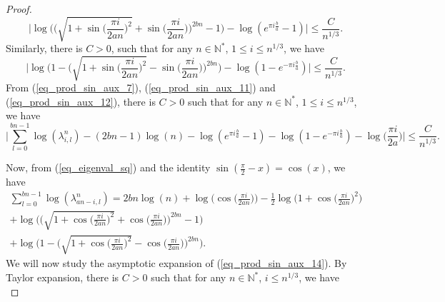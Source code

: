 \documentclass[10pt,a4paper]{amsart}
\newcommand{\nat}{\mathbb{N}}
\begin{document}
\begin{proof}
\begin{equation}
				\bigg|
				\log 
				\Big(
					\Big( \sqrt{ 1 + \sin  \big( \frac{\pi i}{2 a n} \big)^2} + \sin  \big( \frac{\pi i}{2 a n} \big) \Big)^{2bn} - 1
				\Big)
				-
				\log(e^{\pi i \frac{b}{a}} - 1)
				\bigg|
				\leq
				\frac{C}{n^{1/3}}.
			\end{equation}
			Similarly, there is $C > 0$, such that for any $n \in \nat^*$, $1 \leq i \leq  n^{1/3}$, we have
			\begin{equation}\label{eq_prod_sin_aux_12}
				\bigg|
				\log 
				\Big(
					1 - \Big(  \sqrt{ 1 + \sin  \big( \frac{\pi i}{2 a n} \big)^2} - \sin  \big( \frac{\pi i}{2 a n} \big) \Big)^{2bn}
				\Big)
				-
				\log(1 - e^{- \pi i \frac{b}{a}})
				\bigg|
				\leq
				\frac{C}{n^{1/3}}.
			\end{equation}
			From (\ref{eq_prod_sin_aux_7}), (\ref{eq_prod_sin_aux_11}) and (\ref{eq_prod_sin_aux_12}), there is $C > 0$ such that for any $n \in \nat^*$, $1 \leq i \leq  n^{1/3}$, we have
			\begin{equation}\label{eq_prod_sin_aux_13}
				\bigg|
				\sum_{l = 0}^{bn - 1} 
				\log(\lambda_{i, l}^{n})
				-
				(2bn - 1) \log(n) 
				-
				\log(e^{\pi i \frac{b}{a}} - 1)
				-
				\log(1 - e^{- \pi i \frac{b}{a}})
				-
				\log 
				\Big(
					\frac{\pi i}{2 a}
				\Big)
				\bigg|
				\leq
				\frac{C}{n^{1/3}}.
			\end{equation}
			\par Now, from (\ref{eq_eigenval_sq}) and the identity $\sin(\frac{\pi}{2} - x) = \cos(x)$, we have
			\begin{multline}\label{eq_prod_sin_aux_14}
				\sum_{l = 0}^{bn - 1} 
				\log(\lambda_{an - i, l}^{n})
				=
				2 bn \log(n) 
				+
				\log \Big(
					\cos  \big( \frac{\pi i}{2 a n} \big)
				\Big)
				-
				\frac{1}{2}
				\log \Big(
					1 + \cos  \big( \frac{\pi i}{2 a n} \big)^2
				\Big)
				\\
				+
				\log 
				\Big(
					\Big( \sqrt{ 1 + \cos  \big( \frac{\pi i}{2 a n} \big)^2} +  \cos  \big( \frac{\pi i}{2 a n} \big) \Big)^{2bn} - 1
				\Big)
				\\
				+
				\log 
				\Big(
					1 - \Big(  \sqrt{ 1 + \cos  \big( \frac{\pi i}{2 a n} \big)^2} - \cos  \big( \frac{\pi i}{2 a n} \big) \Big)^{2bn}
				\Big).
			\end{multline}
			We will now study the asymptotic expansion of (\ref{eq_prod_sin_aux_14}).
			By Taylor expansion, there is $C > 0$ such that for any $n \in \nat^*$, $i \leq n^{1/3}$, we have
			\begin{equation}\label{eq_prod_sin_aux_15}

\end{equation}
\end{proof}
\end{document}
